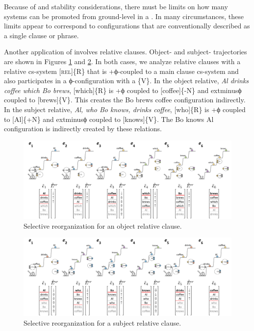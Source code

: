   Because of  and stability considerations, there must be limits on how many systems can be promoted from ground-level in a . In many circumstances, these limits appear to correspond to configurations that are conventionally described as a single clause or  phrase.

  Another application of  involves relative clauses. Ob\-ject- and subject- trajectories are shown in Figures {\ref{fig:4:52}} and {\ref{fig:4:53}}. In both cases, we analyze relative clauses with a relative cs-system [\textsc{rel}]\{R\} that is +ϕ-coupled to a main clause cs-system and also participates in a ϕ-con\-fig\-u\-ra\-tion with a  \{V\}. In the object relative, \textit{Al drinks coffee which Bo brews}, [which]\{R\} is +ϕ coupled to [coffee]\{-N\} and 	extminus{}ϕ coupled to [brews]\{V\}. This creates the {\textbar}Bo brews coffee{\textbar} configuration indirectly. In the subject relative, \textit{Al, who Bo knows, drinks coffee}, [who]\{R\} is +ϕ coupled to [Al]\{+N\} and 	extminus{}ϕ coupled to [knows]\{V\}. The {\textbar}Bo knows Al{\textbar} configuration is indirectly created by these relations.

  
\begin{figure}
\includegraphics[width=\textwidth]{figures/Tilsen-img102.png}
\caption{Selective reorganization for an object relative clause.}
\label{fig:4:52}
\end{figure}
 

  
\begin{figure}
\includegraphics[width=\textwidth]{figures/Tilsen-img103.png}
\caption{Selective reorganization for a subject relative clause.}
\label{fig:4:53}
\end{figure}
 

